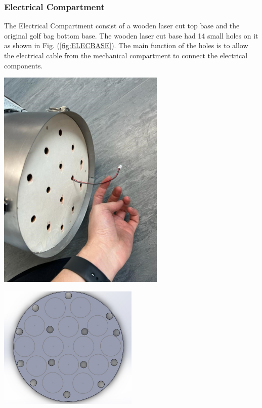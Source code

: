 \documentclass[11pt,landscape]{article}
\newenvironment{Figure}
  {\par\medskip\noindent\minipage{\linewidth}}
  {\endminipage\par\medskip}
\begin{document}
\begin{multicols}{3}
    \subsubsection{Electrical Compartment}
    The Electrical Compartment consist of a wooden laser cut top base and the
    original golf bag bottom base. The wooden laser cut base had 14 small holes
    on it as shown in Fig. (\ref{fig:ELECBASE}). The main function of the holes
    is to allow the electrical cable from the mechanical compartment to connect
    the electrical components.
    
    \begin{Figure}
        \begin{center}
            \includegraphics[width=0.6\textwidth]{Figure8.jpg}
            \label{fig:ELECBASE}
        \end{center}
    \end{Figure}
    
    
    
    \begin{Figure}
        \begin{center}
            \includegraphics[width=0.5\textwidth]{Figure9.jpg}
            \label{fig:ELEC}
        \end{center}
    \end{Figure}


\end{multicols}
\end{document}
